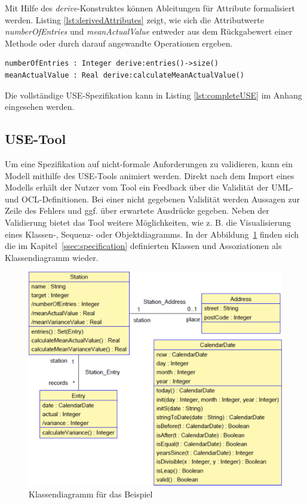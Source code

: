 \documentclass[a4paper,twoside]{article}
\begin{document}
Mit Hilfe des \textit{derive}-Konstruktes können Ableitungen für Attribute formalisiert werden. Listing \ref{lst:derivedAttributes} zeigt, wie sich die Attributwerte \textit{numberOfEntries} und \textit{meanActualValue} entweder aus dem Rückgabewert einer Methode oder durch darauf angewandte Operationen ergeben.
\begin{lstlisting}[caption={Abgeleitete Attribute der Klasse Station},label=lst:derivedAttributes]
numberOfEntries : Integer derive:entries()->size()
meanActualValue : Real derive:calculateMeanActualValue()
\end{lstlisting}

Die vollständige USE-Spezifikation kann in Listing \ref{lst:completeUSE} im Anhang eingesehen werden.
\subsection{USE-Tool}
\label{sec:use_tool}

Um eine Spezifikation auf nicht-formale Anforderungen zu validieren, kann ein Modell mithilfe des USE-Tools animiert werden. Direkt nach dem Import eines Modells erhält der Nutzer vom Tool ein Feedback über die Validität der UML- und OCL-Definitionen. Bei einer nicht gegebenen Validität werden Aussagen zur Zeile des Fehlers und ggf. über erwartete Ausdrücke gegeben. Neben der Validierung bietet das Tool weitere Möglichkeiten, wie z. B. die Visualisierung eines Klassen-, Sequenz- oder Objektdiagramms. In der Abbildung~\ref{fig:Grafik2} finden sich die im Kapitel~\ref{ssec:specification} definierten Klassen und Assoziationen als Klassendiagramm wieder.

\begin{figure}[!h]
	\includegraphics[scale=.325]{pics/USE_class_diagram_v2.pdf}
	\caption{Klassendiagramm für das Beispiel}
	\label{fig:Grafik2}
\end{figure}
\end{document}
